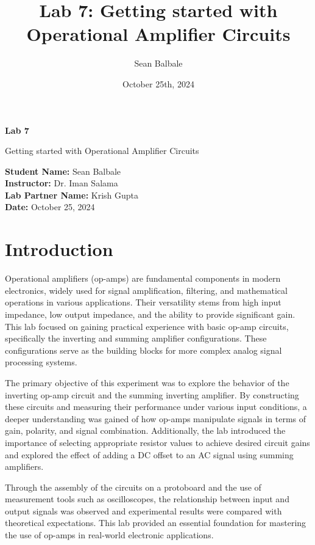 \documentclass[12pt]{article}
\title{Lab 7: Getting started with Operational Amplifier Circuits}
\author{Sean Balbale}
\date{October 25th, 2024}
\begin{document}
\begin{titlepage}
	\begin{center}
		\vspace*{1in}

		\Huge
		\textbf{Lab 7}

		\LARGE
		Getting started with Operational Amplifier Circuits

		\vspace{3 in}

		\textbf{Student Name:} Sean Balbale
		\\ \textbf{Instructor:} Dr. Iman Salama
		\\ \textbf{Lab Partner Name:} Krish Gupta
		\\ \textbf{Date:} October 25, 2024

		\vfill


	\end{center}
\end{titlepage}

\newpage

\section{Introduction} 

Operational amplifiers (op-amps) are fundamental components in modern
electronics, widely used for signal amplification, filtering, and mathematical
operations in various applications. Their versatility stems from high input
impedance, low output impedance, and the ability to provide significant gain.
This lab focused on gaining practical experience with basic op-amp circuits,
specifically the inverting and summing amplifier configurations. These
configurations serve as the building blocks for more complex analog signal
processing systems.
\newline

The primary objective of this experiment was to explore the behavior of the
inverting op-amp circuit and the summing inverting amplifier. By constructing
these circuits and measuring their performance under various input conditions, a
deeper understanding was gained of how op-amps manipulate signals in terms of
gain, polarity, and signal combination. Additionally, the lab introduced the
importance of selecting appropriate resistor values to achieve desired circuit
gains and explored the effect of adding a DC offset to an AC signal using
summing amplifiers.
\newline

Through the assembly of the circuits on a protoboard and the use of measurement
tools such as oscilloscopes, the relationship between input and output signals
was observed and experimental results were compared with theoretical
expectations. This lab provided an essential foundation for mastering the use of
op-amps in real-world electronic applications.
\end{document}
